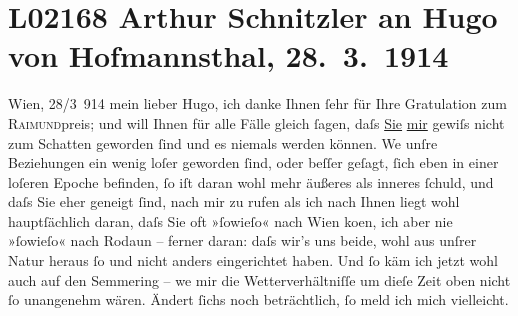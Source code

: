

\section[Arthur Schnitzler an Hugo von Hofmannsthal, 28. 3. 1914]{L02168 Arthur Schnitzler an Hugo von Hofmannsthal, 28. 3. 1914}
\nopagebreak{}
\rehead{ }\normalsize\beginnumbering{}
\toendnotes[C]{\smallbreak\pagebreak[2]}
\toendnotes[C]{\smallbreak}
\pstart
           \raggedleft{}{\pb}Wien, 28/3 914\pend
           \vspace{0.5em}
\pstart
           mein lieber Hugo, ich danke Ihnen ſehr für Ihre Gratulation zum \textsc{Raimund}preis; und will Ihnen für alle Fälle gleich
               ſagen, daſs \uline{Sie}{ }\uline{mir} gewiſs nicht zum Schatten geworden ſind und es
               niemals werden können. We{\geminationn} unſre Beziehungen ein wenig
               loſer geworden ſind, oder beſſer geſagt, ſich \introOben{}eben\introOben{} in einer
               loſeren Epoche befinden, ſo iſt daran wohl mehr äußeres als inneres ſchuld,  und daſs Sie eher geneigt ſind, nach mir zu rufen als ich nach Ihnen liegt
               wohl hauptſächlich daran, daſs Sie oft »ſowieſo« nach Wien ko{\geminationm}en, ich aber nie »ſowieſo« nach Rodaun – ferner daran: daſs wir’s uns beide, wohl
               aus unſrer Natur heraus ſo und nicht anders eingerichtet haben. Und ſo käm ich jetzt
               wohl auch auf den Semmering – we{\geminationn} mir die Wetterverhältniſſe um dieſe Zeit oben nicht ſo
               unangenehm wären. Ändert ſichs noch beträchtlich, ſo meld ich mich vielleicht.
